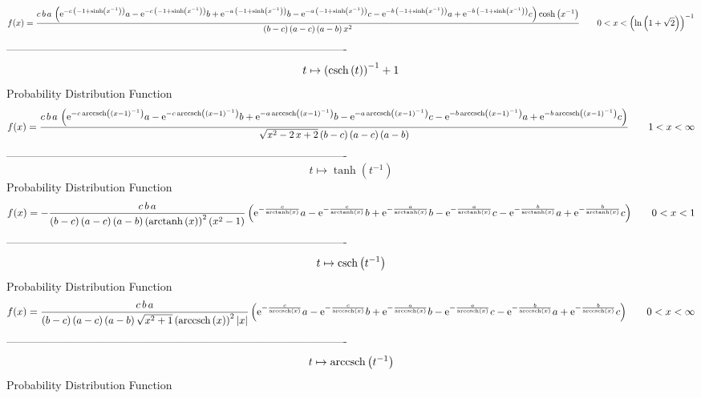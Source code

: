 \documentclass[12pt]{article}
\begin{document}
$$  f(x)={\frac {c\,b\,a\, \left( {{\rm e}^{-c\, \left( -1+\sinh \left( {x}^{-1
} \right)  \right) }}a-{{\rm e}^{-c\, \left( -1+\sinh \left( {x}^{-1}
 \right)  \right) }}b+{{\rm e}^{-a\, \left( -1+\sinh \left( {x}^{-1}
 \right)  \right) }}b-{{\rm e}^{-a\, \left( -1+\sinh \left( {x}^{-1}
 \right)  \right) }}c-{{\rm e}^{-b\, \left( -1+\sinh \left( {x}^{-1}
 \right)  \right) }}a+{{\rm e}^{-b\, \left( -1+\sinh \left( {x}^{-1}
 \right)  \right) }}c \right) \cosh \left( {x}^{-1} \right) }{ \left( 
b-c \right)  \left( a-c \right)  \left( a-b \right) {x}^{2}}}
 \qquad0
 < x <  \left( \ln  \left( 1+\sqrt {2} \right)  \right) ^{-1}
$$-------------------------------------------------------------------------------------------  \\$$t\mapsto  \left( {\rm csch} \left(t\right) \right) ^{-1}+1
$$Probability Distribution Function 
$$  f(x)={\frac {c\,b\,a\, \left( {{\rm e}^{-c\,{\rm arccsch} \left( \left( x-1
 \right) ^{-1}\right)}}a-{{\rm e}^{-c\,{\rm arccsch} \left( \left( x-1
 \right) ^{-1}\right)}}b+{{\rm e}^{-a\,{\rm arccsch} \left( \left( x-1
 \right) ^{-1}\right)}}b-{{\rm e}^{-a\,{\rm arccsch} \left( \left( x-1
 \right) ^{-1}\right)}}c-{{\rm e}^{-b\,{\rm arccsch} \left( \left( x-1
 \right) ^{-1}\right)}}a+{{\rm e}^{-b\,{\rm arccsch} \left( \left( x-1
 \right) ^{-1}\right)}}c \right) }{\sqrt {{x}^{2}-2\,x+2} \left( b-c
 \right)  \left( a-c \right)  \left( a-b \right) }}
 \qquad1
 < x < \infty 
$$-------------------------------------------------------------------------------------------  \\$$t\mapsto \tanh \left( {t}^{-1} \right) 
$$Probability Distribution Function 
$$  f(x)=-{\frac {c\,b\,a}{ \left( b-c \right)  \left( a-c \right)  \left( a-b
 \right)  \left( {\rm arctanh} \left(x\right) \right) ^{2} \left( {x}^
{2}-1 \right) } \left( {{\rm e}^{-{\frac {c}{{\rm arctanh} \left(x
\right)}}}}a-{{\rm e}^{-{\frac {c}{{\rm arctanh} \left(x\right)}}}}b+{
{\rm e}^{-{\frac {a}{{\rm arctanh} \left(x\right)}}}}b-{{\rm e}^{-{
\frac {a}{{\rm arctanh} \left(x\right)}}}}c-{{\rm e}^{-{\frac {b}{
{\rm arctanh} \left(x\right)}}}}a+{{\rm e}^{-{\frac {b}{{\rm arctanh} 
\left(x\right)}}}}c \right) }
 \qquad0
 < x < 1
$$-------------------------------------------------------------------------------------------  \\$$t\mapsto {\rm csch} \left({t}^{-1}\right)
$$Probability Distribution Function 
$$  f(x)={\frac {c\,b\,a}{ \left( b-c \right)  \left( a-c \right)  \left( a-b
 \right) \sqrt {{x}^{2}+1} \left( {\rm arccsch} \left(x\right)
 \right) ^{2} \left| x \right| } \left( {{\rm e}^{-{\frac {c}{
{\rm arccsch} \left(x\right)}}}}a-{{\rm e}^{-{\frac {c}{{\rm arccsch} 
\left(x\right)}}}}b+{{\rm e}^{-{\frac {a}{{\rm arccsch} \left(x\right)
}}}}b-{{\rm e}^{-{\frac {a}{{\rm arccsch} \left(x\right)}}}}c-{{\rm e}
^{-{\frac {b}{{\rm arccsch} \left(x\right)}}}}a+{{\rm e}^{-{\frac {b}{
{\rm arccsch} \left(x\right)}}}}c \right) }
 \qquad0
 < x < \infty 
$$-------------------------------------------------------------------------------------------  \\$$t\mapsto {\rm arccsch} \left({t}^{-1}\right)
$$Probability Distribution Function 
\end{document}
